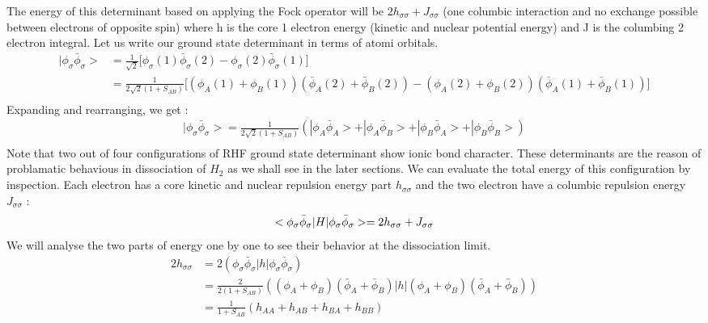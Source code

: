 \documentclass[11pt]{article}   	%
\begin{document}
	The energy of this determinant based on applying the Fock operator will be $2h_{\sigma \sigma} + J_{\sigma \sigma}$ (one columbic interaction 
	and no exchange possible between electrons of opposite spin) where h is the core 1 electron energy (kinetic and nuclear potential energy)
	and J is the columbing 2 electron integral. Let us write our ground state determinant in terms of atomi orbitals.\\
	\begin{equation}
	\begin{split}
		|\phi_{\sigma}\bar{\phi}_{\sigma}> &=\frac{1}{\sqrt{2}}\big[ \phi_{\sigma}(1)\bar{\phi}_{\sigma}(2)
				-\phi_{\sigma}(2)\bar{\phi}_{\sigma}(1)\big]\\
			&=\frac{1}{2\sqrt{2}(1+S_{AB})}\big[(\phi_A(1)+\phi_B(1))(\bar{\phi}_A(2)+\bar{\phi}
			_B(2))-(\phi_A(2)+\phi_B(2))(\bar{\phi}_A(1)+\bar{\phi}_B(1))\big]\\
	\end{split}
	\end{equation}
	Expanding and rearranging, we get :\\
	\begin{equation}
	\begin{split}
	|\phi_{\sigma}\bar{\phi}_{\sigma}>=\frac{1}{2\sqrt{2}(1+S_{AB})}(|\phi_A \bar{\phi}_A>+|\phi_A \bar{\phi}_B>+|\phi_B \bar{\phi}_A>+|\phi_B \bar{\phi}_B>)\\
	\end{split}
	\end{equation}
	Note that two out of four configurations of RHF ground state determinant show ionic bond character. These determinants are the reason of
	problamatic behavious in dissociation of $H_2$ as we shall see in the later sections. We can evaluate the total energy of this configuration by inspection. Each electron has a core kinetic and nuclear repulsion 
	energy part $h_{\sigma \sigma}$ and the two electron have a columbic repulsion energy
	 $J_{\sigma \sigma}$ :\\
	\begin{equation}
		<\phi_{\sigma}\bar{\phi}_{\sigma}|H|\phi_{\sigma}\bar{\phi}_{\sigma}>
		=2 h_{\sigma \sigma}+J_{\sigma \sigma}\\
	\end{equation}
	We will analyse the two parts of energy one by one to see their behavior at the dissociation limit. \\
	\begin{equation}
	\begin{split}
		2 h_{\sigma \sigma}&=2 (\phi_{\sigma}\bar{\phi}_{\sigma}|h|
		\phi_{\sigma}\bar{\phi}_{\sigma})\\
		&=\frac{2}{2(1+S_{AB})}((\phi_A+\phi_B)(\bar{\phi}_A+\bar{\phi}_B)|h|(\phi_A+\phi_B)(\bar{\phi}_A+\bar{\phi}_B))\\
		&=\frac{1}{1+S_{AB}}(h_{AA}+h_{AB}+h_{BA}+h_{BB})\\
	\end{split}
	\end{equation}
\end{document}
